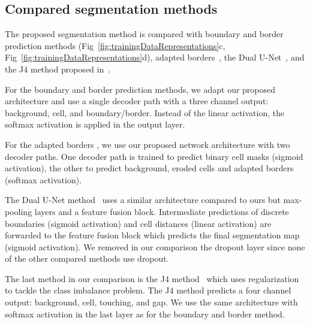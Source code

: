 \documentclass[10pt,letterpaper]{article}
\begin{document}
\subsection*{Compared segmentation methods}
The proposed segmentation method is compared with boundary and border prediction methods (Fig~\ref{fig:trainingDataRepresentations}c, Fig~\ref{fig:trainingDataRepresentations}d), adapted borders~\cite{Scherr2018}, the Dual U-Net~\cite{Li2019}, and the J4 method proposed in~\cite{Pena2019}.

For the boundary and border prediction methods, we adapt our proposed architecture and use a single decoder path with a three channel output: background, cell, and boundary/border. Instead of the linear activation, the softmax activation is applied in the output layer. 

For the adapted borders \cite{Scherr2018}, we use our proposed network architecture with two decoder paths. One decoder path is trained to predict binary cell masks (sigmoid activation), the other to predict background, eroded cells and adapted borders (softmax activation).

The Dual U-Net method~\cite{Li2019} uses a similar architecture compared to ours but max-pooling layers and a feature fusion block. Intermediate predictions of discrete boundaries (sigmoid activation) and cell distances (linear activation) are forwarded to the feature fusion block which predicts the final segmentation map (sigmoid activation). We removed in our comparison the dropout layer since none of the other compared methods use dropout.

The last method in our comparison is the J4 method~\cite{Pena2019} which uses  regularization to tackle the class imbalance problem. The J4 method predicts a four channel output: background, cell, touching, and gap. We use the same architecture with softmax activation in the last layer as for the boundary and border method.
\end{document}
